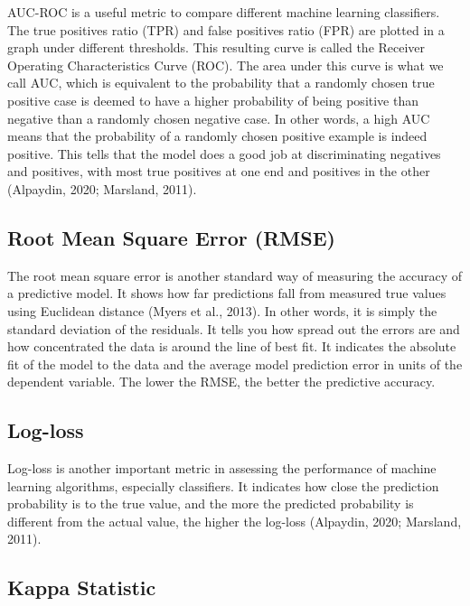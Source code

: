 \documentclass[
  man]{apa7}
\begin{document}
AUC-ROC is a useful metric to compare different machine learning classifiers.
The true positives ratio (TPR) and false positives ratio (FPR) are plotted in a graph under different thresholds.
This resulting curve is called the Receiver Operating Characteristics Curve (ROC).
The area under this curve is what we call AUC, which is equivalent to the probability that a randomly chosen true positive case is deemed to have a higher probability of being positive than negative than a randomly chosen negative case.
In other words, a high AUC means that the probability of a randomly chosen positive example is indeed positive.
This tells that the model does a good job at discriminating negatives and positives, with most true positives at one end and positives in the other (Alpaydin, 2020; Marsland, 2011).

\hypertarget{root-mean-square-error-rmse}{%
\subsection{Root Mean Square Error (RMSE)}\label{root-mean-square-error-rmse}}

The root mean square error is another standard way of measuring the accuracy of a predictive model.
It shows how far predictions fall from measured true values using Euclidean distance (Myers et al., 2013).
In other words, it is simply the standard deviation of the residuals.
It tells you how spread out the errors are and how concentrated the data is around the line of best fit.
It indicates the absolute fit of the model to the data and the average model prediction error in units of the dependent variable.
The lower the RMSE, the better the predictive accuracy.

\hypertarget{log-loss}{%
\subsection{Log-loss}\label{log-loss}}

Log-loss is another important metric in assessing the performance of machine learning algorithms, especially classifiers.
It indicates how close the prediction probability is to the true value, and the more the predicted probability is different from the actual value, the higher the log-loss (Alpaydin, 2020; Marsland, 2011).

\hypertarget{kappa-statistic}{%
\subsection{Kappa Statistic}\label{kappa-statistic}}
\end{document}
